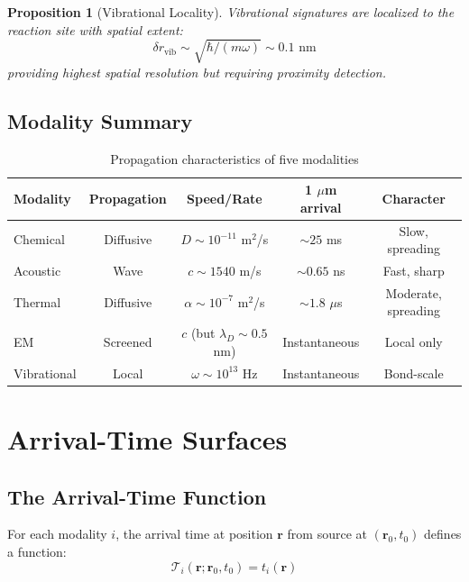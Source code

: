 \documentclass[11pt,a4paper]{article}
\newtheorem{proposition}[theorem]{Proposition}
\theoremstyle{remark}
\newcommand{\rxnpos}{\mathbf{r}_0}
\newcommand{\rxntime}{t_0}
\newcommand{\obspos}{\mathbf{r}}
\begin{document}
\begin{proposition}[Vibrational Locality]
\label{prop:vib_local}
Vibrational signatures are localized to the reaction site with spatial extent:
\begin{equation}
    \delta r_{\text{vib}} \sim \sqrt{\hbar/(m\omega)} \sim 0.1 \text{ nm}
\end{equation}
providing highest spatial resolution but requiring proximity detection.
\end{proposition}

\subsection{Modality Summary}

\begin{table}[H]
\centering
\caption{Propagation characteristics of five modalities}
\label{tab:modalities}
\begin{tabular}{lcccc}
\toprule
Modality & Propagation & Speed/Rate & 1 $\mu$m arrival & Character \\
\midrule
Chemical & Diffusive & $D \sim 10^{-11}$ m$^2$/s & $\sim 25$ ms & Slow, spreading \\
Acoustic & Wave & $c \sim 1540$ m/s & $\sim 0.65$ ns & Fast, sharp \\
Thermal & Diffusive & $\alpha \sim 10^{-7}$ m$^2$/s & $\sim 1.8$ $\mu$s & Moderate, spreading \\
EM & Screened & $c$ (but $\lambda_D \sim 0.5$ nm) & Instantaneous & Local only \\
Vibrational & Local & $\omega \sim 10^{13}$ Hz & Instantaneous & Bond-scale \\
\bottomrule
\end{tabular}
\end{table}

\section{Arrival-Time Surfaces}
\label{sec:arrival}

\subsection{The Arrival-Time Function}

For each modality $i$, the arrival time at position $\obspos$ from source at $(\rxnpos, \rxntime)$ defines a function:
\begin{equation}
    \mathcal{T}_i(\obspos; \rxnpos, \rxntime) = t_i(\obspos)
\end{equation}
\end{document}
